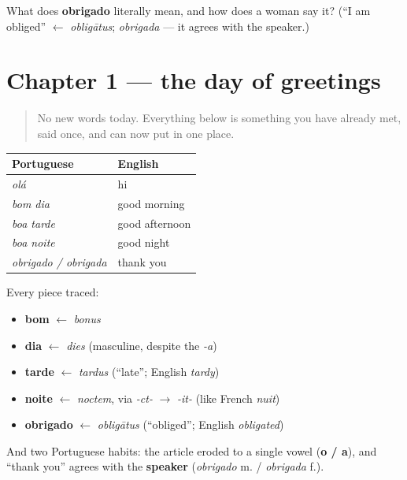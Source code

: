 \begin{tcolorbox}[breakable,colback=teal!4,colframe=teal!35!black,title={Before you move on}]
What does \textbf{obrigado} literally mean, and how does a woman say it? (\textquotedblleft{}I am obliged\textquotedblright{} $\leftarrow$ \emph{obligātus}; \emph{obrigada} — it agrees with the speaker.)
\end{tcolorbox}
\section[Practice]{Chapter 1 — the day of greetings}

\label{lesson:PT-C01-practice}



\begin{quote}
No new words today. Everything below is something you have already met, said once, and can now put in one place.
\end{quote}

\begin{grammarlens}[title={What you've built — the day of greetings}]
\noindent
\begin{tabularx}{\linewidth}{@{}>{\raggedright\arraybackslash}X>{\raggedright\arraybackslash}X@{}}
\toprule
\textbf{Portuguese} & \textbf{English} \\
\midrule
\emph{olá} & hi \\
\emph{bom dia} & good morning \\
\emph{boa tarde} & good afternoon \\
\emph{boa noite} & good night \\
\emph{obrigado / obrigada} & thank you \\
\bottomrule
\end{tabularx}

Every piece traced:

\begin{itemize}
\raggedright
  \item \textbf{bom} $\leftarrow$ \emph{bonus}
  \item \textbf{dia} $\leftarrow$ \emph{dies} (masculine, despite the \emph{-a})
  \item \textbf{tarde} $\leftarrow$ \emph{tardus} (\textquotedblleft{}late\textquotedblright{}; English \emph{tardy})
  \item \textbf{noite} $\leftarrow$ \emph{noctem}, via \emph{-ct-} $\to$ \emph{-it-} (like French \emph{nuit})
  \item \textbf{obrigado} $\leftarrow$ \emph{obligātus} (\textquotedblleft{}obliged\textquotedblright{}; English \emph{obligated})
\end{itemize}

And two Portuguese habits: the article eroded to a single vowel (\textbf{o / a}), and \textquotedblleft{}thank you\textquotedblright{} agrees with the \textbf{speaker} (\emph{obrigado} m. / \emph{obrigada} f.).
\end{grammarlens}

